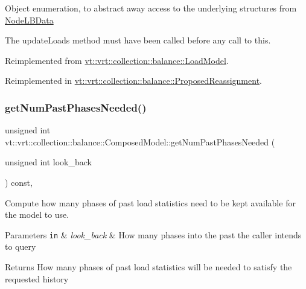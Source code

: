Object enumeration, to abstract away access to the underlying structures from \hyperlink{structvt_1_1vrt_1_1collection_1_1balance_1_1_node_l_b_data}{Node\+L\+B\+Data}

The {\ttfamily update\+Loads} method must have been called before any call to this. 

Reimplemented from \hyperlink{structvt_1_1vrt_1_1collection_1_1balance_1_1_load_model_a438cd95f1c60b4232152335c4ee950bc}{vt\+::vrt\+::collection\+::balance\+::\+Load\+Model}.



Reimplemented in \hyperlink{structvt_1_1vrt_1_1collection_1_1balance_1_1_proposed_reassignment_a7134943ece9dc9a0d4539536f60eed6e}{vt\+::vrt\+::collection\+::balance\+::\+Proposed\+Reassignment}.

\mbox{\label{classvt_1_1vrt_1_1collection_1_1balance_1_1_composed_model_a20bb994d1b3b27eb2a82729d7d5c30f3}} 
\subsubsection{\texorpdfstring{get\+Num\+Past\+Phases\+Needed()}{getNumPastPhasesNeeded()}}
{\footnotesize\ttfamily unsigned int vt\+::vrt\+::collection\+::balance\+::\+Composed\+Model\+::get\+Num\+Past\+Phases\+Needed (\begin{DoxyParamCaption}\item[{unsigned int}]{look\+\_\+back }\end{DoxyParamCaption}) const\hspace{0.3cm}{\ttfamily [override]}, {\ttfamily [virtual]}}



Compute how many phases of past load statistics need to be kept available for the model to use. 


\begin{DoxyParams}[1]{Parameters}
\mbox{\tt in}  & {\em look\+\_\+back} & How many phases into the past the caller intends to query\\
\hline
\end{DoxyParams}
\begin{DoxyReturn}{Returns}
How many phases of past load statistics will be needed to satisfy the requested history 
\end{DoxyReturn}


